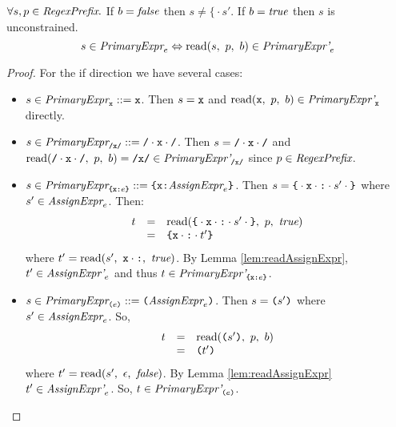 \documentclass[onecolumn]{sigplanconf-onecolumn}
\begin{document}
\begin{lemma}\mbox{}
  
  \( \forall s, p \in \textit{RegexPrefix}. \)
  If \( b = \textit{false} \) then \( s \not = \texttt{\{} \cdot s' \). If \(
  b = \textit{true} \) then \( s \) is unconstrained.
  \[ 
  s \in \textit{PrimaryExpr}_{e} \Leftrightarrow 
  \textrm{read}(s,~p,~b) \in \textit{PrimaryExpr'}_{e} 
  \]
\end{lemma}
\begin{proof}
  For the if direction we have several cases:
  \begin{itemize}
  \item \( s \in \textit{PrimaryExpr}_{\texttt{x}} ::= \texttt{x} \). Then \( s
    = \texttt{x} \) and \( \textrm{read}(\texttt{x},~p,~b) \in
    \textit{PrimaryExpr'}_{\texttt{x}} \) directly.

  \item \( s \in \textit{PrimaryExpr}_{\texttt{/x/}} ::= \texttt{/} \cdot \texttt{x} \cdot \texttt{/} \). Then \( s
    = \texttt{/} \cdot \texttt{x} \cdot \texttt{/} \) and \( \textrm{read}(\texttt{/} \cdot \texttt{x} \cdot \texttt{/},~p,~b) = \texttt{/x/} \in
    \textit{PrimaryExpr'}_{\texttt{/x/}} \) since \( p \in \textit{RegexPrefix} \).

  \item \( s \in \textit{PrimaryExpr}_{\texttt{\{}\texttt{x}\texttt{:}e\texttt{\}}}
    ::= \texttt{\{}\texttt{x}\texttt{:} \textit{AssignExpr}_{e}\texttt{\}} \).
    Then \( s = \texttt{\{} \cdot \texttt{x} \cdot \texttt{:} \cdot 
    s' \cdot \texttt{\}} \) where \(
    s' \in \textit{AssignExpr}_{e} \). Then:
    \[
    \begin{array}{rcl}
      t &=& \textrm{read}(\texttt{\{} \cdot \texttt{x}\cdot  
        \texttt{:} \cdot s' \cdot \texttt{\}},~p,~\textit{true})
      \\
      &=& \texttt{\{}\texttt{x} \cdot \texttt{:} \cdot t'\texttt{\}}
    \end{array}
    \]
    where \( t' = \textrm{read}(s',~\texttt{x} \cdot \texttt{:},~\textit{true}) \). By Lemma
    \ref{lem:readAssignExpr}, \( t' \in
    \textit{AssignExpr'}_{e} \) and thus \( t \in
    \textit{PrimaryExpr'}_{\texttt{\{}\texttt{x}\texttt{:}e\texttt{\}}} \).
    
  \item \( s \in \textit{PrimaryExpr}_{\texttt{(}e\texttt{)}}
    ::= \texttt{(}\textit{AssignExpr}_{e}\texttt{)} \). Then \( s = \texttt{(}s'\texttt{)} \)
    where \( s' \in \textit{AssignExpr}_{e} \). So,
    \[
    \begin{array}{rcl}
      t &=& \textrm{read}(\texttt{(}s'\texttt{)},~p,~b)
      \\
      &=& \texttt{(}t'\texttt{)}
    \end{array}
    \]
    where \( t' = \textrm{read}(s',~\epsilon,~\textit{false}) \). By Lemma
    \ref{lem:readAssignExpr} \( t' \in
    \textit{AssignExpr'}_{e} \). So, \( t \in
    \textit{PrimaryExpr'}_{\texttt{(}e\texttt{)}} \).
  \end{itemize}
\end{proof}
\end{document}
